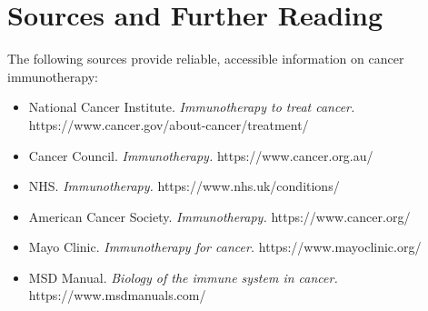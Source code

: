 \section*{Sources and Further Reading}
The following sources provide reliable, accessible information on cancer immunotherapy:
\begin{itemize}
    \item National Cancer Institute. \textit{Immunotherapy to treat cancer.} https://www.cancer.gov/about-cancer/treatment/
    \item Cancer Council. \textit{Immunotherapy.} https://www.cancer.org.au/
    \item NHS. \textit{Immunotherapy.} https://www.nhs.uk/conditions/
    \item American Cancer Society. \textit{Immunotherapy.} https://www.cancer.org/
    \item Mayo Clinic. \textit{Immunotherapy for cancer.} https://www.mayoclinic.org/
    \item MSD Manual. \textit{Biology of the immune system in cancer.} https://www.msdmanuals.com/
\end{itemize}
